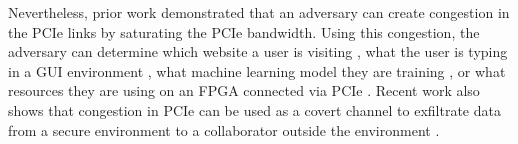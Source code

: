 Nevertheless, prior work demonstrated that an adversary can create congestion in the PCIe links by saturating the PCIe bandwidth.
Using this congestion, the adversary can determine which website a user is visiting \cite{tan2021invisible, side2022lockeddown}, what the user is typing in a GUI environment \cite{tan2021invisible}, what machine learning model they are training \cite{tan2021invisible}, or what resources they are using on an FPGA connected via PCIe \cite{giechaskiel2022cross}.
Recent work also shows that congestion in PCIe can be used as a covert channel to exfiltrate data from a secure environment to a collaborator outside the environment \cite{giechaskiel2022cross, khaliq2021timing}.

\begin{comment}
https://www.linkedin.com/pulse/pci-express-primer-3-transaction-layer-simon-southwell/
\end{comment}
